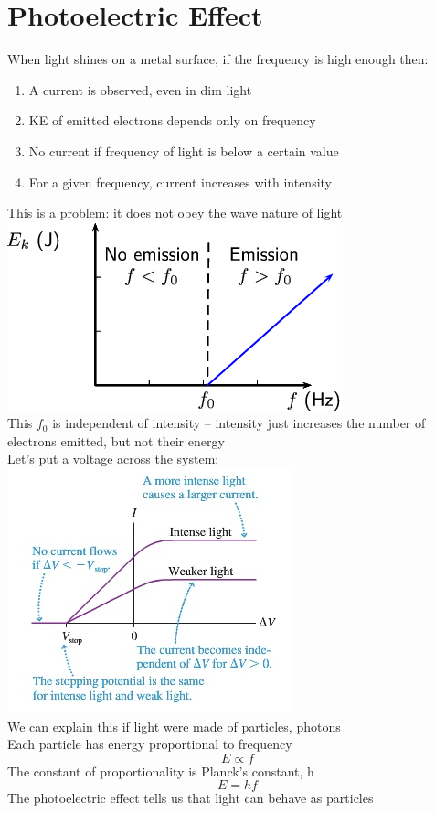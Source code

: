 \documentclass[a4paper, 11pt, fleqn, normalem]{report}
\begin{document}
\section{Photoelectric Effect}
When light shines on a metal surface, if the frequency is high enough then:
\begin{enumerate}
    \item A current is observed, even in dim light
    \item KE of emitted electrons depends only on frequency
    \item No current if frequency of light is below a certain value
    \item For a given frequency, current increases with intensity
\end{enumerate}
This is a problem: it does not obey the wave nature of light \\
\includegraphics[scale=0.7]{Photoelec.png} \\
This $f_{0}$ is independent of intensity -- intensity just increases the number of electrons emitted, but not their energy \\
Let's put a voltage across the system: \\
\includegraphics{currentvsvoltage.jpg} \\
We can explain this if light were made of particles, photons \\
Each particle has energy proportional to frequency
\begin{equation*}
    E \propto f
\end{equation*}
The constant of proportionality is Planck's constant, h
\begin{equation*}
    E = hf
\end{equation*}
The photoelectric effect tells us that light can behave as particles
\end{document}
